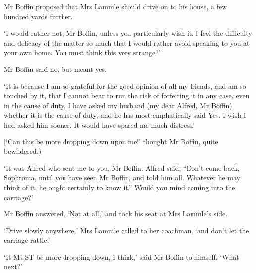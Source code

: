 Mr Boffin proposed that Mrs Lammle should drive on to his house, a few
hundred yards further.

‘I would rather not, Mr Boffin, unless you particularly wish it. I feel
the difficulty and delicacy of the matter so much that I would rather
avoid speaking to you at your own home. You must think this very
strange?’

Mr Boffin said no, but meant yes.

‘It is because I am so grateful for the good opinion of all my
friends, and am so touched by it, that I cannot bear to run the risk of
forfeiting it in any case, even in the cause of duty. I have asked my
husband (my dear Alfred, Mr Boffin) whether it is the cause of duty,
and he has most emphatically said Yes. I wish I had asked him sooner. It
would have spared me much distress.’

[‘Can this be more dropping down upon me!’ thought Mr Boffin, quite
bewildered.)

‘It was Alfred who sent me to you, Mr Boffin. Alfred said, “Don’t
come back, Sophronia, until you have seen Mr Boffin, and told him all.
Whatever he may think of it, he ought certainly to know it.” Would you
mind coming into the carriage?’

Mr Boffin answered, ‘Not at all,’ and took his seat at Mrs Lammle’s
side.

‘Drive slowly anywhere,’ Mrs Lammle called to her coachman, ‘and don’t
let the carriage rattle.’

‘It MUST be more dropping down, I think,’ said Mr Boffin to himself.
‘What next?’



